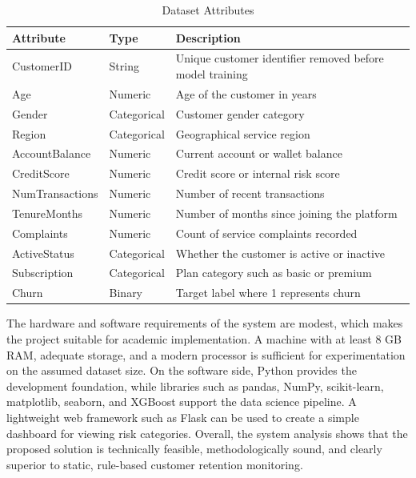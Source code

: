 \begin{table}[H]
\centering
\caption{Dataset Attributes}
\begin{tabular}{|p{3.1cm}|p{2.2cm}|p{6.4cm}|}
\hline
\textbf{Attribute} & \textbf{Type} & \textbf{Description} \\ \hline
CustomerID & String & Unique customer identifier removed before model training \\ \hline
Age & Numeric & Age of the customer in years \\ \hline
Gender & Categorical & Customer gender category \\ \hline
Region & Categorical & Geographical service region \\ \hline
AccountBalance & Numeric & Current account or wallet balance \\ \hline
CreditScore & Numeric & Credit score or internal risk score \\ \hline
NumTransactions & Numeric & Number of recent transactions \\ \hline
TenureMonths & Numeric & Number of months since joining the platform \\ \hline
Complaints & Numeric & Count of service complaints recorded \\ \hline
ActiveStatus & Categorical & Whether the customer is active or inactive \\ \hline
Subscription & Categorical & Plan category such as basic or premium \\ \hline
Churn & Binary & Target label where 1 represents churn \\ \hline
\end{tabular}
\label{tab:dataset_attributes_analysis}
\end{table}

The hardware and software requirements of the system are modest, which makes the project suitable for academic implementation. A machine with at least 8 GB RAM, adequate storage, and a modern processor is sufficient for experimentation on the assumed dataset size. On the software side, Python provides the development foundation, while libraries such as pandas, NumPy, scikit-learn, matplotlib, seaborn, and XGBoost support the data science pipeline. A lightweight web framework such as Flask can be used to create a simple dashboard for viewing risk categories. Overall, the system analysis shows that the proposed solution is technically feasible, methodologically sound, and clearly superior to static, rule-based customer retention monitoring.
